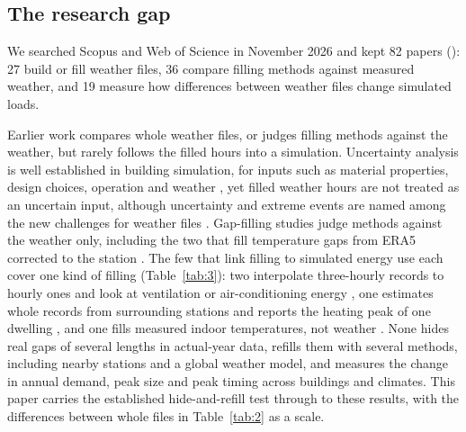 \subsection{The research gap}\label{sec:2.5}

We searched Scopus and Web of Science in November 2026 and kept 82 papers (): 27 build or fill weather files, 36 compare filling methods against measured weather, and 19 measure how differences between weather files change simulated loads.

Earlier work compares whole weather files, or judges filling methods against the weather, but rarely follows the filled hours into a simulation. Uncertainty analysis is well established in building simulation, for inputs such as material properties, design choices, operation and weather \citep{hopfe2011,tian2013,wang2012}, yet filled weather hours are not treated as an uncertain input, although uncertainty and extreme events are named among the new challenges for weather files \citep{herrera2017}. Gap-filling studies judge methods against the weather only, including the two that fill temperature gaps from ERA5 corrected to the station \citep{lompar2019,jacobs2024}. The few that link filling to simulated energy use each cover one kind of filling (Table~\ref{tab:3}): two interpolate three-hourly records to hourly ones and look at ventilation or air-conditioning energy \citep{anjomshoaa2019,liu2022}, one estimates whole records from surrounding stations and reports the heating peak of one dwelling \citep{eguiaoller2017}, and one fills measured indoor temperatures, not weather \citep{titikpina2015}. None hides real gaps of several lengths in actual-year data, refills them with several methods, including nearby stations and a global weather model, and measures the change in annual demand, peak size and peak timing across buildings and climates. This paper carries the established hide-and-refill test through to these results, with the differences between whole files in Table~\ref{tab:2} as a scale.

